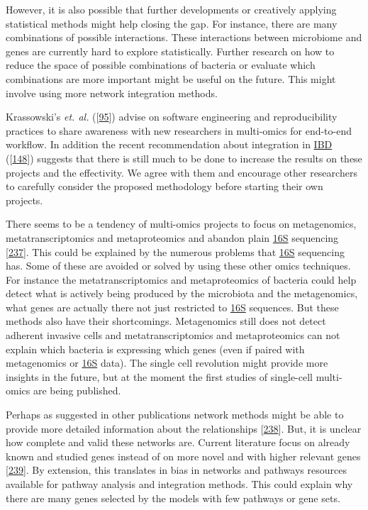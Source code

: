 \documentclass[
  12pt,
  a4paper,
  twoside,
  openright]{book}
\begin{document}
However, it is also possible that further developments or creatively applying statistical methods might help closing the gap.
For instance, there are many combinations of possible interactions.
These interactions between microbiome and genes are currently hard to explore statistically.
Further research on how to reduce the space of possible combinations of bacteria or evaluate which combinations are more important might be useful on the future.
This might involve using more network integration methods.

Krassowski's \emph{et. al.} ({[}\protect\hyperlink{ref-krassowski2020}{95}{]}) advise on software engineering and reproducibility practices to share awareness with new researchers in multi-omics for end-to-end workflow.
In addition the recent recommendation about integration in \protect\hyperlink{acronyms_IBD}{IBD} ({[}\protect\hyperlink{ref-sudhakar2022}{148}{]}) suggests that there is still much to be done to increase the results on these projects and the effectivity.
We agree with them and encourage other researchers to carefully consider the proposed methodology before starting their own projects.

There seems to be a tendency of multi-omics projects to focus on metagenomics, metatranscriptomics and metaproteomics and abandon plain \protect\hyperlink{acronyms_16S}{16S} sequencing {[}\protect\hyperlink{ref-zhang2019}{237}{]}.
This could be explained by the numerous problems that \protect\hyperlink{acronyms_16S}{16S} sequencing has.
Some of these are avoided or solved by using these other omics techniques.
For instance the metatranscriptomics and metaproteomics of bacteria could help detect what is actively being produced by the microbiota and the metagenomics, what genes are actually there not just restricted to \protect\hyperlink{acronyms_16S}{16S} sequences.
But these methods also have their shortcomings.
Metagenomics still does not detect adherent invasive cells and metatranscriptomics and metaproteomics can not explain which bacteria is expressing which genes (even if paired with metagenomics or \protect\hyperlink{acronyms_16S}{16S} data).
The single cell revolution might provide more insights in the future, but at the moment the first studies of single-cell multi-omics are being published.

Perhaps as suggested in other publications network methods might be able to provide more detailed information about the relationships {[}\protect\hyperlink{ref-jiang2019}{238}{]}.
But, it is unclear how complete and valid these networks are.
Current literature focus on already known and studied genes instead of on more novel and with higher relevant genes {[}\protect\hyperlink{ref-haynes2018}{239}{]}.
By extension, this translates in bias in networks and pathways resources available for pathway analysis and integration methods.
This could explain why there are many genes selected by the models with few pathways or gene sets.
\end{document}
